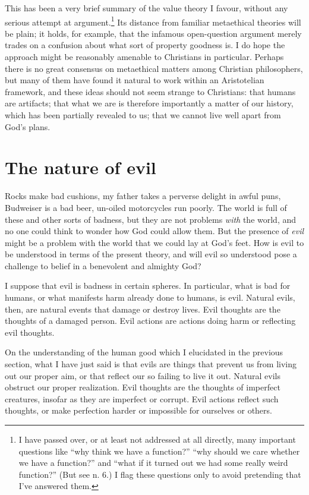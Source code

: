 \documentclass[11pt]{amsart}
\begin{document}
This has been a very brief summary of the value theory I favour, without any serious attempt at argument.\footnote{I have passed over, or at least not addressed at all directly, many important questions like ``why think we have a function?'' ``why should we care whether we have a function?'' and ``what if it turned out we had some really weird function?'' (But see n. 6.) I flag these questions only to avoid pretending that I've answered them.} Its distance from familiar metaethical theories will be plain; it holds, for example, that the infamous open-question argument merely trades on a confusion about what sort of property goodness is. I do hope the approach might be reasonably amenable to Christians in particular. Perhaps there is no great consensus on metaethical matters among Christian philosophers, but many of them have found it natural to work within an Aristotelian framework, and these ideas should not seem strange to Christians: that humans are artifacts; that what we are is therefore importantly a matter of our history, which has been partially revealed to us; that we cannot live well apart from God's plans.

\section{The nature of evil}


Rocks make bad cushions, my father takes a perverse delight in awful puns, Budweiser is a bad beer, un-oiled motorcycles run poorly. The world is full of these and other sorts of badness, but they are not problems \emph{with} the world, and no one could think to wonder how God could allow them. But the presence of \emph{evil} might be a problem with the world that we could lay at God's feet. How is evil to be understood in terms of the present theory, and will evil so understood pose a challenge to belief in a benevolent and almighty God?

I suppose that evil is badness in certain spheres. In particular, what is bad for humans, or what manifests harm already done to humans, is evil. Natural evils, then, are natural events that damage or destroy lives. Evil thoughts are the thoughts of a damaged person. Evil actions are actions doing harm or reflecting evil thoughts.

On the understanding of the human good which I elucidated in the previous section, what I have just said is that evils are things that prevent us from living out our proper aim, or that reflect our so failing to live it out. Natural evils obstruct our proper realization. Evil thoughts are the thoughts of imperfect creatures, insofar as they are imperfect or corrupt. Evil actions reflect such thoughts, or make perfection harder or impossible for ourselves or others.
\end{document}
